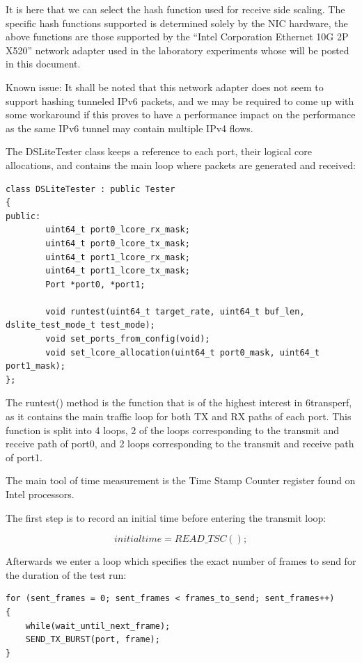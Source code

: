 \documentclass[a4paper,12p]{article}
\begin{document}
It is here that we can select the hash function used for receive side scaling. The specific hash functions supported is determined solely by the NIC hardware, the above functions are those supported by the “Intel Corporation Ethernet 10G 2P X520” network adapter used in the laboratory experiments whose will be posted in this document. 

Known issue: It shall be noted that this network adapter does not seem to support hashing tunneled IPv6 packets, and we may be required to come up with some workaround if this proves to have a performance impact on the performance as the same IPv6 tunnel may contain multiple IPv4 flows.
	
The DSLiteTester class keeps a reference to each port, their logical core allocations, and contains the main loop where packets are generated and received:

\begin{lstlisting}
class DSLiteTester : public Tester
{
public:
        uint64_t port0_lcore_rx_mask;
        uint64_t port0_lcore_tx_mask;
        uint64_t port1_lcore_rx_mask;
        uint64_t port1_lcore_tx_mask;
        Port *port0, *port1;

        void runtest(uint64_t target_rate, uint64_t buf_len, dslite_test_mode_t test_mode);
        void set_ports_from_config(void);
        void set_lcore_allocation(uint64_t port0_mask, uint64_t port1_mask);
};
\end{lstlisting}

	The runtest() method is the function that is of the highest interest in 6transperf, as it contains the main traffic loop for both TX and RX paths of each port. This function is split into 4 loops, 2 of the loops corresponding to the transmit and receive path of port0, and 2 loops corresponding to the transmit and receive path of port1. 

The main tool of time measurement is the Time Stamp Counter register found on Intel processors. 

The first step is to record an initial time before entering the transmit loop:

		$$initial time = READ\_TSC();$$

Afterwards we enter a loop which specifies the exact number of frames to send for the duration of the test run:

\begin{lstlisting}
for (sent_frames = 0; sent_frames < frames_to_send; sent_frames++)
{
	while(wait_until_next_frame);
	SEND_TX_BURST(port, frame);
}
\end{lstlisting}
\end{document}
